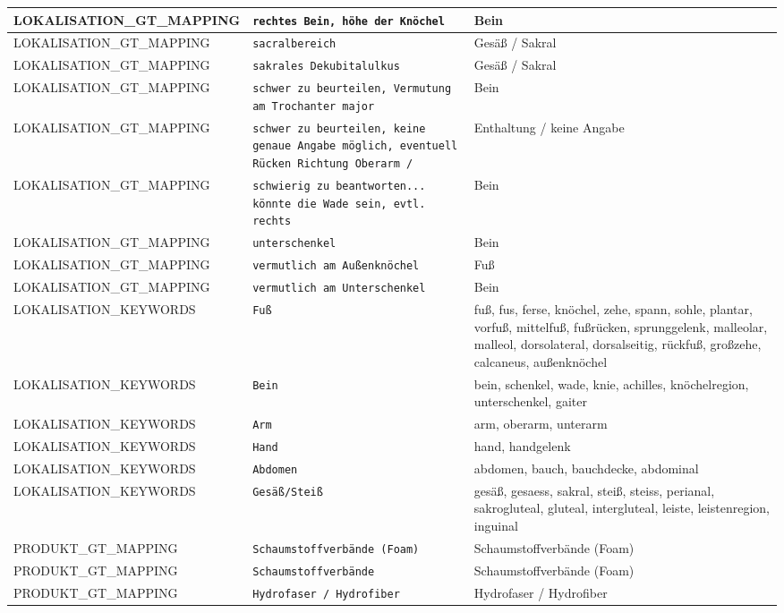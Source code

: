 \begin{longtable}{|p{3.5cm}|p{5cm}|p{6.5cm}|}
LOKALISATION\_GT\_MAPPING & \texttt{rechtes Bein, höhe der Knöchel} & Bein \\ \hline
LOKALISATION\_GT\_MAPPING & \texttt{sacralbereich} & Gesäß / Sakral \\ \hline
LOKALISATION\_GT\_MAPPING & \texttt{sakrales Dekubitalulkus} & Gesäß / Sakral \\ \hline
LOKALISATION\_GT\_MAPPING & \texttt{schwer zu beurteilen, Vermutung am Trochanter major} & Bein \\ \hline
LOKALISATION\_GT\_MAPPING & \texttt{schwer zu beurteilen, keine genaue Angabe möglich,
eventuell Rücken Richtung Oberarm /} & Enthaltung / keine Angabe \\ \hline
LOKALISATION\_GT\_MAPPING & \texttt{schwierig zu beantworten... könnte die Wade sein, evtl. rechts} & Bein \\ \hline
LOKALISATION\_GT\_MAPPING & \texttt{unterschenkel} & Bein \\ \hline
LOKALISATION\_GT\_MAPPING & \texttt{vermutlich am Außenknöchel} & Fuß \\ \hline
LOKALISATION\_GT\_MAPPING & \texttt{vermutlich am Unterschenkel} & Bein \\ \hline
LOKALISATION\_KEYWORDS & \texttt{Fuß} & fuß, fus, ferse, knöchel, zehe, spann, sohle, plantar, vorfuß, mittelfuß, fußrücken, sprunggelenk, malleolar, malleol, dorsolateral, dorsalseitig, rückfuß, großzehe, calcaneus, außenknöchel \\ \hline
LOKALISATION\_KEYWORDS & \texttt{Bein} & bein, schenkel, wade, knie, achilles, knöchelregion, unterschenkel, gaiter \\ \hline
LOKALISATION\_KEYWORDS & \texttt{Arm} & arm, oberarm, unterarm \\ \hline
LOKALISATION\_KEYWORDS & \texttt{Hand} & hand, handgelenk \\ \hline
LOKALISATION\_KEYWORDS & \texttt{Abdomen} & abdomen, bauch, bauchdecke, abdominal \\ \hline
LOKALISATION\_KEYWORDS & \texttt{Gesäß/Steiß} & gesäß, gesaess, sakral, steiß, steiss, perianal, sakrogluteal, gluteal, intergluteal, leiste, leistenregion, inguinal \\ \hline
PRODUKT\_GT\_MAPPING & \texttt{Schaumstoffverbände (Foam)} & Schaumstoffverbände (Foam) \\ \hline
PRODUKT\_GT\_MAPPING & \texttt{Schaumstoffverbände} & Schaumstoffverbände (Foam) \\ \hline
PRODUKT\_GT\_MAPPING & \texttt{Hydrofaser / Hydrofiber} & Hydrofaser / Hydrofiber \\ \hline

\end{longtable}
